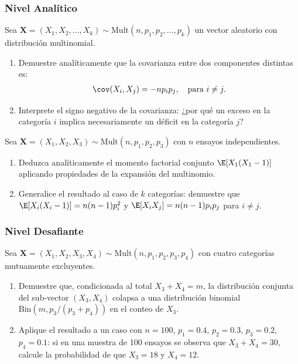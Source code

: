 \subsubsection*{Nivel Analítico}

\begin{problema}
	\label{prob:3.8.7}
	Sea $\bm{X} = (X_{1}, X_{2}, \dots, X_{k}) \sim \text{Mult}(n, p_{1}, p_{2}, \dots, p_{k})$ un vector aleatorio con distribución multinomial.
	\begin{enumerate}
		\item Demuestre analíticamente que la covarianza entre dos componentes distintas es:
		\begin{align*}
			\cov(X_{i}, X_{j}) = -n p_{i} p_{j}, \quad \text{para } i \neq j.
		\end{align*}
		\item Interprete el signo negativo de la covarianza: ¿por qué un exceso en la categoría $i$ implica necesariamente un déficit en la categoría $j$?
	\end{enumerate}
\end{problema}

\begin{problema}
	\label{prob:3.8.8}
	Sea $\bm{X} = (X_{1}, X_{2}, X_{3}) \sim \text{Mult}(n, p_{1}, p_{2}, p_{3})$ con $n$ ensayos independientes.
	\begin{enumerate}
		\item Deduzca analíticamente el momento factorial conjunto $\E[X_{1}(X_{1}-1)]$ aplicando propiedades de la expansión del multinomio.
		\item Generalice el resultado al caso de $k$ categorías: demuestre que $\E[X_{i}(X_{i}-1)] = n(n-1)p_{i}^{2}$ y $\E[X_{i} X_{j}] = n(n-1)p_{i} p_{j}$ para $i \neq j$.
	\end{enumerate}
\end{problema}

\subsubsection*{Nivel Desafiante}

\begin{problema}
	\label{prob:3.8.9}
	Sea $\bm{X} = (X_{1}, X_{2}, X_{3}, X_{4}) \sim \text{Mult}(n, p_{1}, p_{2}, p_{3}, p_{4})$ con cuatro categorías mutuamente excluyentes.
	\begin{enumerate}
		\item Demuestre que, condicionada al total $X_{3} + X_{4} = m$, la distribución conjunta del sub-vector $(X_{3}, X_{4})$ colapsa a una distribución binomial $\text{Bin}(m, p_{3}/(p_{3} + p_{4}))$ en el conteo de $X_{3}$.
		\item Aplique el resultado a un caso con $n = 100$, $p_{1} = 0.4$, $p_{2} = 0.3$, $p_{3} = 0.2$, $p_{4} = 0.1$: si en una muestra de 100 ensayos se observa que $X_{3} + X_{4} = 30$, calcule la probabilidad de que $X_{3} = 18$ y $X_{4} = 12$.
	\end{enumerate}
\end{problema}

